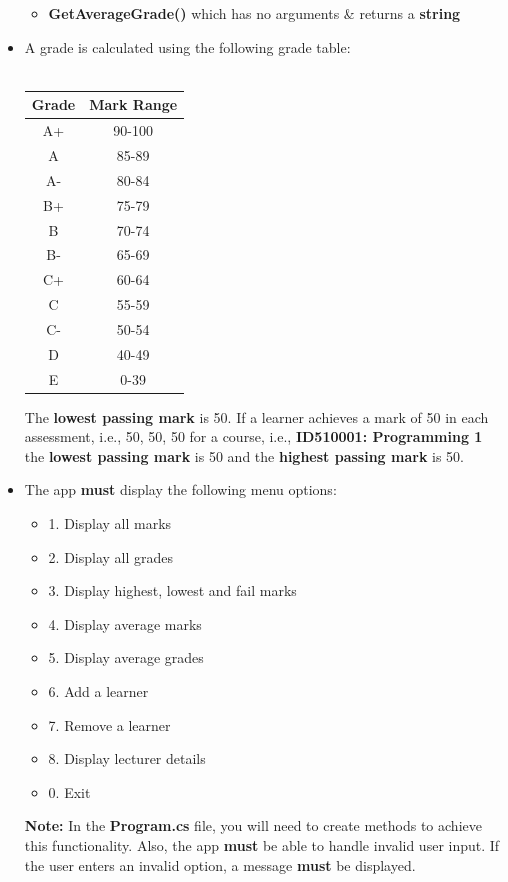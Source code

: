 \documentclass{article}
\begin{document}
\begin{itemize}
\begin{itemize}
        \item \textbf{GetAverageGrade()} which has no arguments \& returns a \textbf{string}
    \end{itemize}
    \item A grade is calculated using the following grade table:\\\\
    \renewcommand{\arraystretch}{1.5}
    \begin{tabular}{|c|c|}
        \hline
        \textbf{Grade} & \textbf{Mark Range} \\ \hline
        A+ & 90-100  \\ \hline
        A & 85-89  \\ \hline
        A- & 80-84 \\ \hline
        B+ & 75-79   \\ \hline
        B & 70-74  \\ \hline
        B- & 65-69  \\ \hline
        C+ & 60-64  \\ \hline
        C & 55-59 \\ \hline
        C- & 50-54  \\ \hline
        D & 40-49   \\ \hline
        E & 0-39   \\ \hline
    \end{tabular}
    The \textbf{lowest passing mark} is 50. If a learner achieves a mark of 50 in each assessment, i.e., 50, 50, 50 for a course, i.e., \textbf{ID510001: Programming 1} the \textbf{lowest passing mark} is 50 and the \textbf{highest passing mark} is 50. 
    \item The app \textbf{must} display the following menu options:
    \begin{itemize}
        \item 1. Display all marks
        \item 2. Display all grades
        \item 3. Display highest, lowest and fail marks
        \item 4. Display average marks
        \item 5. Display average grades
        \item 6. Add a learner
        \item 7. Remove a learner
        \item 8. Display lecturer details
        \item 0. Exit
    \end{itemize}
    \textbf{Note:} In the \textbf{Program.cs} file, you will need to create methods to achieve this functionality. Also, the app \textbf{must} be able to handle invalid user input. If the user enters an invalid option, a message \textbf{must} be displayed.

\end{itemize}
\end{document}
